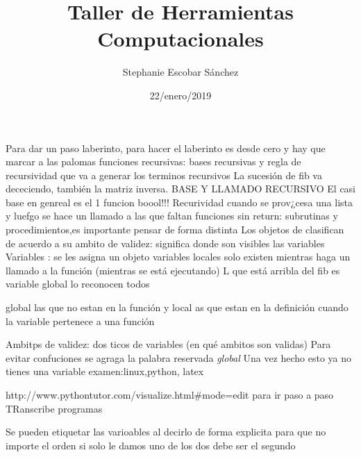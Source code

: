 \documentclass{article}
\title{\Huge Taller de Herramientas Computacionales}
\author{Stephanie Escobar Sánchez}
\date{22/enero/2019}
\begin{document}
	\maketitle





Para dar un paso laberinto, para hacer el laberinto  es desde cero  y hay que marcar a las palomas 
funciones recursivas: bases recursivas y regla de recursividad que va a generar los terminos recursivos
La sucesión de fib va dececiendo, también la matriz inversa. BASE Y LLAMADO RECURSIVO
El casi base en genreal es el 1
funcion boool!!!
Recurividad cuando se prov¿cesa una lista y luefgo se hace un llamado a las que faltan
funciones sin return: subrutinas y procedimientos,es importante pensar de forma distinta
Los objetos de clasifican de acuerdo a su ambito de validez: significa donde son visibles las variables
Variables : se les asigna un objeto
variables locales solo existen mientras haga un llamado a la función (mientras se está ejecutando)
L que está arribla del fib es variable global lo reconocen todos 

global las que no estan en la función 
y local as que estan en la definición cuando la variable pertenece a una función 

Ambitps de validez: dos ticos de variables (en qué ambitos son validas)
Para evitar confuciones se agraga la palabra reservada \textit{global}
Una vez hecho esto ya no tienes una variable
examen:linux,python, latex

http://www.pythontutor.com/visualize.html#mode=edit para ir paso a paso 
TRanscribe programas 

Se pueden etiquetar las varioables al decirlo de forma explicita para que no importe el orden 
si solo le damos uno de los dos debe ser el segundo
\end{document}
